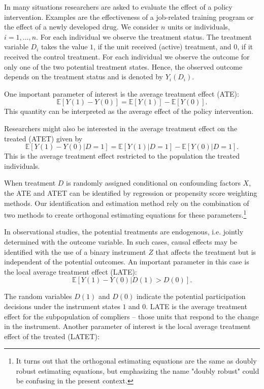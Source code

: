 \documentclass{amsart}\usepackage[]{graphicx}\usepackage[]{color}
\begin{document}
In many situations researchers are asked to evaluate the effect of a policy intervention. Examples are the effectiveness of a job-related training program or the effect of a newly developed drug. We consider $n$ units or individuals, $i=1,\ldots,n$. For each individual we observe the treatment status. The treatment variable $D_i$ takes the value $1$, if the unit received (active) treatment, and $0$, if it received the control treatment. For each individual we observe the outcome for only one of the two potential treatment states. Hence, the observed outcome depends on the treatment status and is denoted by $Y_i(D_i)$. 

One important parameter of interest is the average treatment effect (ATE):
\[ \mathbb{E}[Y(1)-Y(0)] =  \mathbb{E}[Y(1)] - \mathbb{E}[Y(0)]. \]
This quantity can be interpreted as the average effect of the policy intervention.

Researchers might also be interested in the average treatment effect on the treated (ATET) given by
\[ \mathbb{E}[Y(1)-Y(0)|D=1] =  \mathbb{E}[Y(1)|D=1] - \mathbb{E}[Y(0)|D=1]. \]
This is the average treatment effect restricted to the population the treated individuals.

When treatment $D$ is randomly assigned conditional on confounding factors $X$, the ATE and ATET can be identified by regression or propensity score weighting methods.  Our identification and estimation method rely on the combination of two methods to create orthogonal estimating equations for these parameters.\footnote{It turns out that the orthogonal estimating equations are the same as doubly robust estimating equations, but emphasizing the name "doubly robust" could be confusing in the present context.}


In observational studies, the potential treatments are endogenous, i.e. jointly determined with the outcome variable.  In such cases, causal effects may be identified with the 
use of a binary instrument $Z$ that affects the treatment but is independent of the potential outcomes.  An important parameter in this case is
the local average treatment effect (LATE):
\[  \mathbb{E}[Y(1)-Y(0)| D(1) > D(0)]. \]

The random variables $D(1)$ and $D(0)$ indicate the potential participation decisions under the instrument states $1$  and $0$.
LATE is the average treatment effect for the subpopulation of compliers -- those units that respond to the change in the instrument.  Another parameter of interest is the  local average treatment effect of the treated (LATET):
\end{document}
